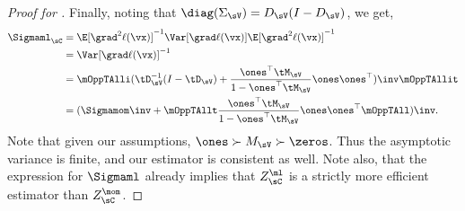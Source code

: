 \begin{proof}[Proof for ]
Finally, noting that $\diag(\Sigma_\sV) = D_\sV (I - D_\sV)$, we get,
\begin{align*}
    \Sigmaml_{\sC} 
      &= \E[\grad^2 \ell(\vx)]^{-1} \Var [\grad \ell(\vx)] \E[\grad^2 \ell(\vx)]^{-1} \\
      &= \Var[\grad \ell(\vx)]^{-1} \\
      &= 
        \mOppTAlli (\tD_{\sV}^{-1} (I - \tD_\sV) + \frac{\ones^\top \tM_\sV}{1 - \ones^\top \tM_\sV} \ones\ones^\top)\inv \mOppTAllit \\
      &= ({\Sigmamom}\inv + \mOppTAllt \frac{\ones^\top \tM_\sV}{1 - \ones^\top \tM_\sV} \ones\ones^\top \mOppTAll)\inv.
\end{align*}
Note that given our assumptions, $\ones \succ M_\sV \succ \zeros$. 
Thus the asymptotic variance is finite, and our estimator is consistent
  as well. 
Note also, that the expression for $\Sigmaml$ already implies that
  $Z^\ml_\sC$ is a strictly more efficient estimator than $Z^\mom_\sC$.

\end{proof}

